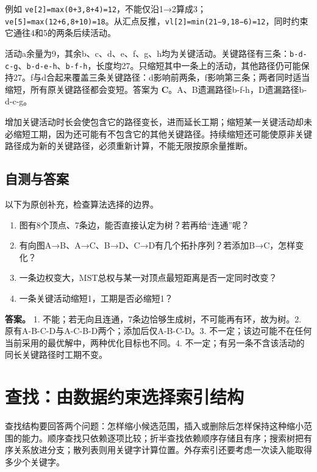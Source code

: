 例如 \texttt{ve{[}2{]}=max(0+3,}\allowbreak{}\texttt{8+4)=12}，不能仅沿1→2算成3；\texttt{ve{[}5{]}=max(12+6,}\allowbreak{}\texttt{8+10)=18}。从汇点反推，\texttt{vl{[}2{]}=min(21−9,}\allowbreak{}\texttt{18−6)=12}，同时约束它通往4和5的两条后续活动。

活动a余量为9，其余b、c、d、e、f、g、h均为关键活动。关键路径有三条：\texttt{b-d-c-g}、\texttt{b-d-e-h}、\texttt{b-f-h}，长度均27。只缩短其中一条上的活动，其他路径仍可能保持27。f与d合起来覆盖三条关键路径：d影响前两条，f影响第三条；两者同时适当缩短，所有原关键路径都会变短。答案为 \textbf{C}。A、B遗漏路径b-f-h，D遗漏路径b-d-c-g。

增加关键活动时长会使包含它的路径变长，进而延长工期；缩短某一关键活动却未必缩短工期，因为还可能有不包含它的其他关键路径。持续缩短还可能使原非关键路径成为新的关键路径，必须重新计算，不能无限按原余量推断。

\section{自测与答案}\label{ds-ch6-check}

以下为原创补充，检查算法选择的边界。

\begin{enumerate}
\def\labelenumi{\arabic{enumi}.}
\tightlist
\item
  图有8个顶点、7条边，能否直接认定为树？若再给``连通''呢？
\item
  有向图A→B、A→C、B→D、C→D有几个拓扑序列？若添加B→C，怎样变化？
\item
  一条边权变大，MST总权与某一对顶点最短距离是否一定同时改变？
\item
  一条关键活动缩短1，工期是否必缩短1？
\end{enumerate}

\textbf{答案。} 1. 不能；若无向且连通，7条边恰够生成树，不可能再有环，故为树。2. 原有A-B-C-D与A-C-B-D两个；添加后仅A-B-C-D。3. 不一定；该边可能不在任何当前采用的最优解中，两种优化目标也不同。4. 不一定；有另一条不含该活动的同长关键路径时工期不变。

\chapter{查找：由数据约束选择索引结构}\label{ds-ch7}

查找结构要回答两个问题：怎样缩小候选范围，插入或删除后怎样保持这种缩小范围的能力。顺序查找只依赖逐项比较；折半查找依赖顺序存储且有序；搜索树把有序关系放进分支；散列表则用关键字计算位置。外存索引还要考虑一次读入能取得多少个关键字。

